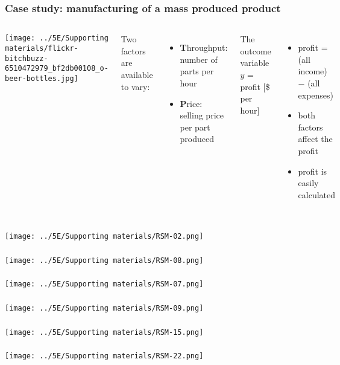 \documentclass[handout,11pt,aspectratio=169,mathserif]{beamer}
\begin{document}
\begin{frame}\frametitle{Case study: manufacturing of a mass produced product}
	\begin{columns}[c]
				\centerline{\texttt{[image: ../5E/Supporting materials/flickr-bitchbuzz-6510472979\_bf2db00108\_o-beer-bottles.jpg]}}
			Two factors are available to vary:
			\begin{itemize}
				\item	\textbf{T}hroughput: number of parts per hour
				\item	\textbf{P}rice: selling price per part produced
			\end{itemize}
			
			\vspace{1cm}
			\pause
			The outcome variable $y$ = profit [\$ per hour]
			
			\begin{itemize}
				\item	profit = (all income) $-$ (all expenses) \pause
				\item	both factors affect the profit
				\item	profit is easily calculated 
			\end{itemize}
	\end{columns}
\end{frame}
\begin{frame}\frametitle{}
	\centerline{\texttt{[image: ../5E/Supporting materials/RSM-02.png]}}
\end{frame}
\begin{frame}\frametitle{}
	\centerline{\texttt{[image: ../5E/Supporting materials/RSM-08.png]}}
\end{frame}
\begin{frame}\frametitle{}
	\centerline{\texttt{[image: ../5E/Supporting materials/RSM-07.png]}}
\end{frame}
\begin{frame}\frametitle{}
	\centerline{\texttt{[image: ../5E/Supporting materials/RSM-09.png]}}
\end{frame}
\begin{frame}\frametitle{}
	\centerline{\texttt{[image: ../5E/Supporting materials/RSM-15.png]}}
\end{frame}
\begin{frame}\frametitle{}
	\centerline{\texttt{[image: ../5E/Supporting materials/RSM-22.png]}}
\end{frame}
\end{document}
